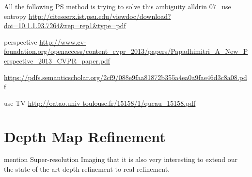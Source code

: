 All the following PS method is trying to solve this ambiguity
alldrin 07~\cite{alldrin2007resolving} use entropy \url{http://citeseerx.ist.psu.edu/viewdoc/download?doi=10.1.1.93.7264&rep=rep1&type=pdf}

\cite{papadhimitri2013new} perspective \url{http://www.cv-foundation.org/openaccess/content_cvpr_2013/papers/Papadhimitri_A_New_Perspective_2013_CVPR_paper.pdf}

\cite{papadhimitri2014closed}\url{https://pdfs.semanticscholar.org/2cf9/088e9faa81872b355a4ea0a9fae46d3c8a08.pdf}

\cite{queau2015solving} use TV \url{http://oatao.univ-toulouse.fr/15158/1/queau_15158.pdf}



\section{Depth Map Refinement}
mention Super-resolution Imaging that it is also very interesting to extend our the state-of-the-art depth refinement to real refinement.


%
%
